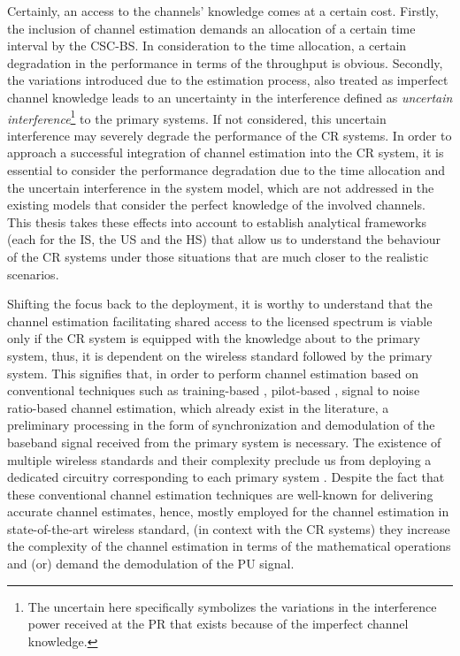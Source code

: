 Certainly, an access to the channels' knowledge comes at a certain cost. Firstly, the inclusion of channel estimation demands an allocation of a certain time interval by the CSC-BS. In consideration to the time allocation, a certain degradation in the performance in terms of the throughput is obvious. Secondly, the variations introduced due to the estimation process, also treated as imperfect channel knowledge leads to an uncertainty in the interference defined as \textit{uncertain interference}\footnote{The uncertain here specifically symbolizes the variations in the interference power received at the PR that exists because of the imperfect channel knowledge.} to the primary systems. If not considered, this uncertain interference may severely degrade the performance of the CR systems. In order to approach a successful integration of channel estimation into the CR system, it is essential to consider the performance degradation due to the time allocation and the uncertain interference in the system model, which are not addressed in the existing models that consider the perfect knowledge of the involved channels. This thesis takes these effects into account to establish analytical frameworks (each for the IS, the US and the HS) that allow us to understand the behaviour of the CR systems under those situations that are much closer to the realistic scenarios. %

Shifting the focus back to the deployment, it is worthy to understand that the channel estimation facilitating shared access to the licensed spectrum is viable only if the CR system is equipped with the knowledge about to the primary system, thus, it is dependent on the wireless standard followed by the primary system. This signifies that, in order to perform channel estimation based on conventional techniques such as  training-based \cite{Stoica03}, pilot-based \cite{Gifford05, Gifford08}, signal to noise ratio-based \cite{Chav11, Sharma13} channel estimation, which already exist in the literature, a preliminary processing in the form of synchronization and demodulation of the baseband signal received from the primary system is necessary. The existence of multiple wireless standards and their complexity preclude us from deploying a dedicated circuitry corresponding to each primary system \cite{Ghasemi08_cm}. Despite the fact that these conventional channel estimation techniques are well-known for delivering accurate channel estimates, hence, mostly employed for the channel estimation in state-of-the-art wireless standard, (in context with the CR systems) they increase the complexity of the channel estimation in terms of the mathematical operations and (or) demand the demodulation of the PU signal. 

